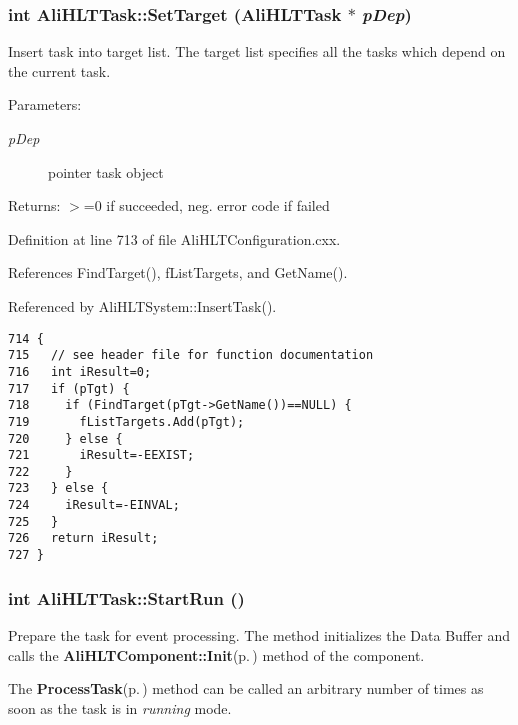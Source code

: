 \subsubsection{\setlength{\rightskip}{0pt plus 5cm}int Ali\-HLTTask::Set\-Target ({\bf Ali\-HLTTask} $\ast$ {\em p\-Dep})}\label{classAliHLTTask_a16}


Insert task into target list. The target list specifies all the tasks which depend on the current task. \begin{Desc}
\item[Parameters:]
\begin{description}
\item[{\em p\-Dep}]pointer task object \end{description}
\end{Desc}
\begin{Desc}
\item[Returns:]$>$=0 if succeeded, neg. error code if failed \end{Desc}


Definition at line 713 of file Ali\-HLTConfiguration.cxx.

References Find\-Target(), f\-List\-Targets, and Get\-Name().

Referenced by Ali\-HLTSystem::Insert\-Task().

\footnotesize\begin{verbatim}714 {
715   // see header file for function documentation
716   int iResult=0;
717   if (pTgt) {
718     if (FindTarget(pTgt->GetName())==NULL) {
719       fListTargets.Add(pTgt);
720     } else {
721       iResult=-EEXIST;
722     }
723   } else {
724     iResult=-EINVAL;
725   }
726   return iResult;
727 }
\end{verbatim}\normalsize 


\subsubsection{\setlength{\rightskip}{0pt plus 5cm}int Ali\-HLTTask::Start\-Run ()}\label{classAliHLTTask_a18}


Prepare the task for event processing. The method initializes the Data Buffer and calls the {\bf Ali\-HLTComponent::Init}{\rm (p.\,\pageref{classAliHLTComponent_a4})} method of the component.\par
 The {\bf Process\-Task}{\rm (p.\,\pageref{classAliHLTTask_a20})} method can be called an arbitrary number of times as soon as the task is in {\em running\/} mode. 

